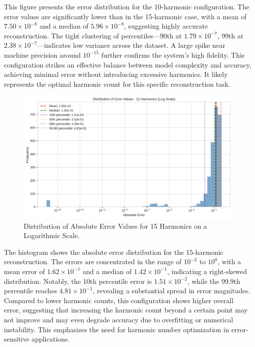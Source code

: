 \documentclass[preprint,12pt]{elsarticle}
\begin{document}
This figure presents the error distribution for the 10-harmonic configuration. The error values are significantly lower than in the 15-harmonic case, with a mean of \(7.50 \times 10^{-8}\) and a median of \(5.96 \times 10^{-8}\), suggesting highly accurate reconstruction. The tight clustering of percentiles—90th at \(1.79 \times 10^{-7}\), 99th at \(2.38 \times 10^{-7}\)—indicates low variance across the dataset. A large spike near machine precision around \(10^{-15}\) further confirms the system's high fidelity. This configuration strikes an effective balance between model complexity and accuracy, achieving minimal error without introducing excessive harmonics. It likely represents the optimal harmonic count for this specific reconstruction task.

\begin{figure}[t]
    \centering
    \includegraphics[width=0.9\linewidth]{figures/error_distribution_15h.png}
    \caption{Distribution of Absolute Error Values for 15 Harmonics on a Logarithmic Scale.}
    \label{fig:error_dist_15h}
\end{figure}

The histogram shows the absolute error distribution for the 15-harmonic reconstruction. The errors are concentrated in the range of \(10^{-2}\) to \(10^0\), with a mean error of \(1.62 \times 10^{-1}\) and a median of \(1.42 \times 10^{-1}\), indicating a right-skewed distribution. Notably, the 10th percentile error is \(1.51 \times 10^{-2}\), while the 99.9th percentile reaches \(4.81 \times 10^{-1}\), revealing a substantial spread in error magnitudes. Compared to lower harmonic counts, this configuration shows higher overall error, suggesting that increasing the harmonic count beyond a certain point may not improve and may even degrade accuracy due to overfitting or numerical instability. This emphasizes the need for harmonic number optimization in error-sensitive applications.
\end{document}
